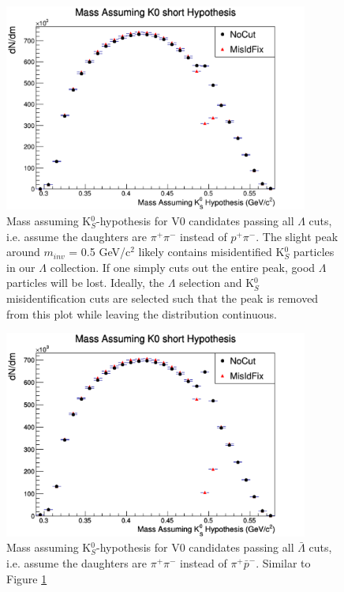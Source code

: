 \begin{figure}[h]
  \centering
  \includegraphics[width=100mm]{3_DataSelection/Figures/MassAssumingK0ShortHypothesis_LamK0.pdf}
  \caption[K$^{0}_{S}$ contamination in $\Lambda$ collection]{Mass assuming K$^{0}_{S}$-hypothesis for V0 candidates passing all $\Lambda$ cuts, i.e. assume the daughters are $\pi^{+}\pi^{-}$ instead of $p^{+}\pi^{-}$.  The slight peak around $m_{inv}$ = 0.5 GeV/c$^{2}$ likely contains misidentified K$^{0}_{S}$ particles in our $\Lambda$ collection.  If one simply cuts out the entire peak, good $\Lambda$ particles will be lost.  Ideally, the $\Lambda$ selection and K$^{0}_{S}$ misidentification cuts are selected such that the peak is removed from this plot while leaving the distribution continuous.}
  \label{fig:MassAssK0ShortHyp_LamK0}
\end{figure}

\begin{figure}[h]
  \centering
  \includegraphics[width=100mm]{3_DataSelection/Figures/MassAssumingK0ShortHypothesis_ALamK0.pdf}
  \caption[K$^{0}_{S}$ contamination in $\bar{\Lambda}$ collection]{Mass assuming K$^{0}_{S}$-hypothesis for V0 candidates passing all $\bar{\Lambda}$ cuts, i.e. assume the daughters are $\pi^{+}\pi^{-}$ instead of $\pi^{+}\bar{p}^{-}$.  Similar to Figure \ref{fig:MassAssK0ShortHyp_LamK0}}
  \label{fig:MassAssK0ShortHyp_ALamK0}
\end{figure}

